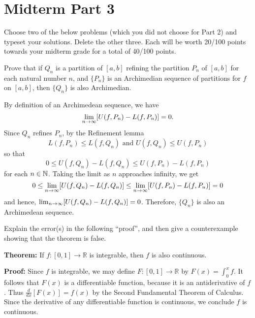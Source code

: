 \documentclass[letterpaper, twoside, 12pt]{book}
\begin{document}
\chapter*{Midterm Part 3}

Choose two of the below problems (which you did not choose for
Part 2) and typeset your solutions. Delete the other three.
Each will be worth 20/100 points towards your midterm grade
for a total of 40/100 points.


\begin{exercise}[1]
Prove that if \(Q_n\) is a partition of \([a,b]\) refining
the partition \(P_n\) of \([a,b]\) for each
natural number \(n\), and \(\{P_n\}\) is an Archimedian sequence of
partitions for \(f\) on \([a,b]\), then \(\{Q_n\}\) is also Archimedian.
\end{exercise}

\begin{solution}
    By definition of an Archimedean sequence, we have 
    \[\lim_{n \to \infty} [U(f, P_n) - L(f, P_n) ] = 0 . \]
    Since \(Q_n\) refines \(P_n\), by the Refinement lemma
    \[ L(f, P_n) \leq L(f, Q_n) \text{~and~} U(f, Q_n) \leq U(f, P_n) \]
    so that 
    \[ 0 \leq U(f, Q_n) - L(f, Q_n) \leq U(f, P_n) - L(f, P_n) \]
    for each \(n \in \mathbb N\). Taking the limit as \(n\) approaches
    infinity, we get
    \[ 0 \leq \lim_{n \to \infty} [U(f, Q_n) - L(f, Q_n)] \leq \lim_{n \to \infty} [U(f, P_n) - L(f, P_n)] = 0 \]
    and hence, \(\lim_{n \to \infty} [U(f, Q_n) - L(f, Q_n)] = 0\). Therefore,
    \(\{Q_n\}\) is also an Archimedean sequence.   
\end{solution}

\begin{exercise}[2]
Explain the error(s) in the following ``proof'',
and then give a counterexample showing that the theorem is false.

\textbf{Theorem:} If \(f:[0,1]\to\mathbb R\) is integrable, then
\(f\) is also continuous.

\textbf{Proof:}
Since \(f\) is integrable, we may define \(F:[0,1]\to\mathbb R\)
by \(F(x)=\int_0^x f\). It follows
that \(F(x)\) is a differentiable function, because it is an antiderivative
of \(f\). Thus \(\frac{d}{dx}[F(x)]=f(x)\) by the Second Fundamental
Theorem of Calculus. Since the derivative of any differentiable function
is continuous, we conclude \(f\) is continuous.
\end{exercise}
\begin{solution}

\end{solution}
\end{document}
